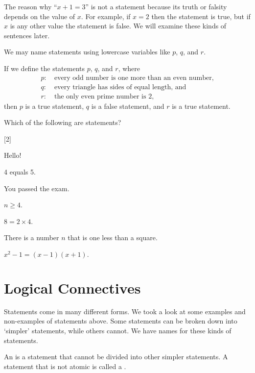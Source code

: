 The reason why ``$x + 1 = 3$'' is not a statement because its truth or falsity depends on the value of $x$. For example, if $x = 2$ then the statement is true, but if $x$ is any other value the statement is false. We will examine these kinds of sentences later.

We may name statements using lowercase variables like $p$, $q$, and $r$.

\begin{example}
    If we define the statements $p$, $q$, and $r$, where
    \begin{align*}
        p: &\ \text{every odd number is one more than an even number},\\
        q: &\ \text{every triangle has sides of equal length}, \text{ and}\\
        r: &\ \text{the only even prime number is 2},
    \end{align*}
    then $p$ is a true statement, $q$ is a false statement, and $r$ is a true statement.
\end{example}

\begin{exercise}
    Which of the following are statements?

    \begin{partquestions}{\alph*}[2]
        \item Hello!
        \item 4 equals 5.
        \item You passed the exam.
        \item $n \geq 4$.
        \item $8 = 2 \times 4$.
        \item There is a number $n$ that is one less than a square.
        \item $x^2 - 1 = (x-1)(x+1)$.
    \end{partquestions}
\end{exercise}

\section{Logical Connectives}
Statements come in many different forms. We took a look at some examples and non-examples of statements above. Some statements can be broken down into `simpler' statements, while others cannot. We have names for these kinds of statements.

\begin{definition}
    An  is a statement that cannot be divided into other simpler statements. A statement that is not atomic is called a .
\end{definition}

